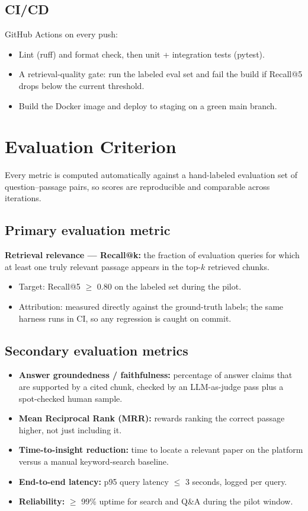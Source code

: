 \documentclass[11pt,a4paper]{article}
\begin{document}
\subsection{CI/CD}
GitHub Actions on every push:
\begin{itemize}[leftmargin=0.7cm]
    \item Lint (ruff) and format check, then unit + integration tests (pytest).
    \item A retrieval-quality gate: run the labeled eval set and fail the build if Recall@5 drops below the current threshold.
    \item Build the Docker image and deploy to staging on a green main branch.
\end{itemize}

\section{Evaluation Criterion}
Every metric is computed automatically against a hand-labeled evaluation set of question--passage pairs, so scores are reproducible and comparable across iterations.

\subsection{Primary evaluation metric}
\textbf{Retrieval relevance --- Recall@k:} the fraction of evaluation queries for which at least one truly relevant passage appears in the top-$k$ retrieved chunks.
\begin{itemize}[leftmargin=0.7cm]
    \item Target: Recall@5 $\ge$ 0.80 on the labeled set during the pilot.
    \item Attribution: measured directly against the ground-truth labels; the same harness runs in CI, so any regression is caught on commit.
\end{itemize}

\subsection{Secondary evaluation metrics}
\begin{itemize}[leftmargin=0.7cm]
    \item \textbf{Answer groundedness / faithfulness:} percentage of answer claims that are supported by a cited chunk, checked by an LLM-as-judge pass plus a spot-checked human sample.
    \item \textbf{Mean Reciprocal Rank (MRR):} rewards ranking the correct passage higher, not just including it.
    \item \textbf{Time-to-insight reduction:} time to locate a relevant paper on the platform versus a manual keyword-search baseline.
    \item \textbf{End-to-end latency:} p95 query latency $\le$ 3 seconds, logged per query.
    \item \textbf{Reliability:} $\ge$ 99\% uptime for search and Q\&A during the pilot window.
\end{itemize}
\end{document}
